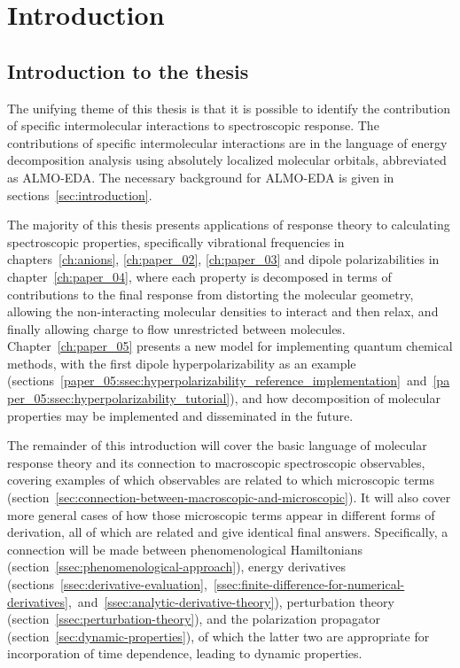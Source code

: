 \documentclass[%
class = book,%
crop = false,%
float = true,%
multi = true,%
preview = false,%
]{standalone}
\begin{document}
\chapter{Introduction}
\label{ch:introduction}

\section{Introduction to the thesis}

The unifying theme of this thesis is that it is possible to identify the contribution of specific intermolecular interactions to spectroscopic response. The contributions of specific intermolecular interactions are in the language of energy decomposition analysis using absolutely localized molecular orbitals, abbreviated as ALMO-EDA. The necessary background for ALMO-EDA is given in sections~\ref{sec:introduction}.

The majority of this thesis presents applications of response theory to calculating spectroscopic properties, specifically vibrational frequencies in chapters~\ref{ch:anions}, \ref{ch:paper_02}, \ref{ch:paper_03} and dipole polarizabilities in chapter~\ref{ch:paper_04}, where each property is decomposed in terms of contributions to the final response from distorting the molecular geometry, allowing the non-interacting molecular densities to interact and then relax, and finally allowing charge to flow unrestricted between molecules. Chapter~\ref{ch:paper_05} presents a new model for implementing quantum chemical methods, with the first dipole hyperpolarizability as an example (sections~\ref{paper_05:ssec:hyperpolarizability_reference_implementation}~and~\ref{paper_05:ssec:hyperpolarizability_tutorial}), and how decomposition of molecular properties may be implemented and disseminated in the future.

The remainder of this introduction will cover the basic language of molecular response theory and its connection to macroscopic spectroscopic observables, covering examples of which observables are related to which microscopic terms (section~\ref{sec:connection-between-macroscopic-and-microscopic}). It will also cover more general cases of how those microscopic terms appear in different forms of derivation, all of which are related and give identical final answers. Specifically, a connection will be made between phenomenological Hamiltonians (section~\ref{ssec:phenomenological-approach}), energy derivatives (sections~\ref{ssec:derivative-evaluation},~\ref{ssec:finite-difference-for-numerical-derivatives},~and~\ref{ssec:analytic-derivative-theory}), perturbation theory (section~\ref{ssec:perturbation-theory}), and the polarization propagator (section~\ref{sec:dynamic-properties}), of which the latter two are appropriate for incorporation of time dependence, leading to dynamic properties.
\end{document}
